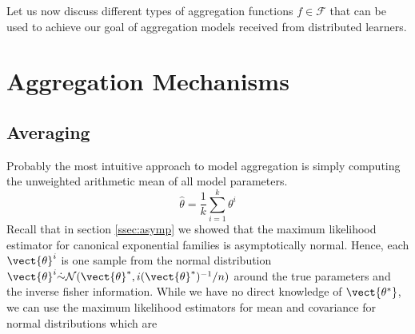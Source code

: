 Let us now discuss different types of aggregation functions $f \in \mathcal{F}$ that can be used to achieve our goal of aggregation models received from distributed learners.

\section{Aggregation Mechanisms}

\subsection{Averaging}

Probably the most intuitive approach to model aggregation is simply computing the unweighted arithmetic mean of all model parameters.
\begin{equation}
    \hat{\theta} = \frac{1}{k} \sum_{i=1}^k \theta^i
\end{equation}
Recall that in section \ref{ssec:asymp} we showed that the maximum likelihood estimator for canonical exponential families is asymptotically normal.
Hence, each $\vect{\theta}^i$ is one sample from the normal distribution $\vect{\theta}^i \dot{\sim} \mathcal{N}(\vect{\theta}^*, i(\vect{\theta}^*)^{-1}/n)$ around the true parameters and the inverse fisher information.
While we have no direct knowledge of $\vect{\theta^*}$, we can use the maximum likelihood estimators for mean and covariance for normal distributions which are

